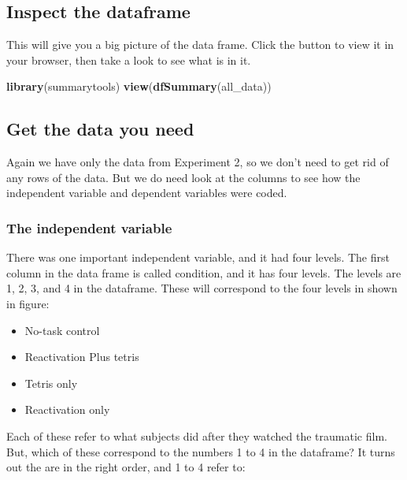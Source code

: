 \documentclass[]{book}
\newenvironment{Shaded}{\begin{snugshade}}{\end{snugshade}}
\newcommand{\KeywordTok}[1]{\textcolor[rgb]{0.13,0.29,0.53}{\textbf{{#1}}}}
\newcommand{\NormalTok}[1]{{#1}}
\providecommand{\tightlist}{%
  \setlength{\itemsep}{0pt}\setlength{\parskip}{0pt}}
\theoremstyle{definition}
\theoremstyle{definition}
\theoremstyle{definition}
\theoremstyle{remark}
\begin{document}
\subsection{Inspect the dataframe}\label{inspect-the-dataframe}

This will give you a big picture of the data frame. Click the button to
view it in your browser, then take a look to see what is in it.

\begin{Shaded}
\begin{Highlighting}[]
\KeywordTok{library}\NormalTok{(summarytools)}
\KeywordTok{view}\NormalTok{(}\KeywordTok{dfSummary}\NormalTok{(all_data))}
\end{Highlighting}
\end{Shaded}

\subsection{Get the data you need}\label{get-the-data-you-need}

Again we have only the data from Experiment 2, so we don't need to get
rid of any rows of the data. But we do need look at the columns to see
how the independent variable and dependent variables were coded.

\subsubsection{The independent variable}\label{the-independent-variable}

There was one important independent variable, and it had four levels.
The first column in the data frame is called condition, and it has four
levels. The levels are 1, 2, 3, and 4 in the dataframe. These will
correspond to the four levels in shown in figure:

\begin{itemize}
\tightlist
\item
  No-task control
\item
  Reactivation Plus tetris
\item
  Tetris only
\item
  Reactivation only
\end{itemize}

Each of these refer to what subjects did after they watched the
traumatic film. But, which of these correspond to the numbers 1 to 4 in
the dataframe? It turns out the are in the right order, and 1 to 4 refer
to:
\end{document}
